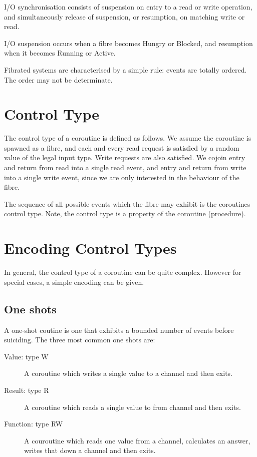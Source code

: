 \documentclass[oneside]{book}
\begin{document}
I/O synchronisation consists of suspension on entry
to a read or write operation, and simultaneously release
of suspension, or resumption, on matching write or read.

I/O suspension occurs when a fibre becomes Hungry or Blocked,
and resumption when it becomes Running or Active.

Fibrated systems are characterised by a simple rule: events are
totally ordered. The order may not be determinate. 

\section{Control Type}
The control type of a coroutine is defined as follows.
We assume the coroutine is spawned as a fibre, and each
and every read request is satisfied by a random value of
the legal input type. Write requests are also satisfied.
We cojoin entry and return from read into a single read
event, and entry and return from write into a single
write event, since we are only interested in the behaviour
of the fibre.

The sequence of all possible events which the fibre
may exhibit is the coroutines control type. Note, the
control type is a property of the coroutine (procedure).

\section{Encoding Control Types}
In general, the control type of a coroutine can be quite
complex. However for special cases, a simple encoding
can be given.

\subsection{One shots}
A one-shot coutine is one that exhibits a bounded number
of events before suiciding. The three most common one
shots are:

\begin{description}
\item[Value: type W] A coroutine which writes a single value to
a channel and then exits.
\item[Result: type R] A coroutine which reads a single value to
from channel and then exits.
\item[Function: type RW] A couroutine which reads one value
from a channel, calculates an answer, writes that
down a channel and then exits.
\end{description}
\end{document}
